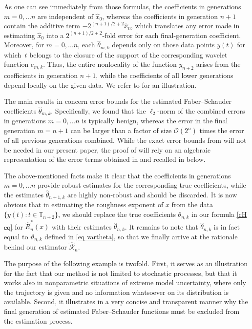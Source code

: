 \documentclass[12pt,reqno]{article}
\def\wh{\widehat}
\numberwithin{equation}{section}
\def\cR{{\mathscr R}}
\theoremstyle{definition}
\def\wh{\widehat}
\newcommand{\bT}{\mathbb{T}}
\begin{document}
As one can see immediately from those formulas,  the coefficients in generations $m=0,\dots n$ are independent of $\wh x_0$, whereas the coefficients in generation $n+1$ contain the additive term $-2^{(n+1)/2+2}\hat x_0$, which translates any error made in estimating $\hat x_0$ into a $2^{(n+1)/2+2}$-fold error for each final-generation coefficient. 
Moreover, for  $m=0,\dots n$, each $\wh\theta_{m,k}$ depends only on those data points $y(t)$ for which~$t$ belongs to the closure of the support of the corresponding wavelet function $e_{m,k}$. Thus, the entire nonlocality of the function $y_{n+2}$ arises from the coefficients in generation $n+1$, while the coefficients of all lower generations depend locally on the given data. We refer to \cite[Figure 2]{HanSchiedMatrix} for an illustration.

The main results in \cite{HanSchiedMatrix} concern error bounds for the estimated Faber--Schauder coefficients $\wh\theta_{m,k}$. Specifically, we found that the $\ell_2$-norm of the combined errors in generations $m=0,\dots n$ is typically benign, whereas the error in the 
  final generation $m=n+1$ can be larger than a factor of size $\mathcal{O}(2^n)$ times the error of all previous generations combined. While the exact error bounds from \cite{HanSchiedMatrix} will not be needed in our present paper, the proof of  will rely on an algebraic representation of the error terms obtained in \cite[Lemma 3.2]{HanSchiedMatrix} and recalled in  below. 




The above-mentioned facts make it clear that the coefficients in generations $m=0,\dots n$ provide robust estimates for the corresponding true coefficients, while the estimates $\wh\theta_{n+1,k}$ are highly non-robust and should be discarded. It is now obvious that in estimating the roughness exponent of $x$ from the data $\{y(t):t\in\bT_{n+2}\}$, we should replace the true coefficients $\theta_{n,k}$ in our formula \eqref{cH eq} for $\wh R^*_n(x)$ with their estimates $\wh\theta_{n,k}$. It remains to note that $\wh\theta_{n,k}$ is in fact equal to $\vartheta_{n,k}$ defined in \eqref{eq vartheta}, so that we finally arrive at the rationale behind our estimator $\wh\cR_n$. 

The purpose of the following example is twofold. First, it serves as an illustration for the fact that our method is not limited to stochastic processes,  but that it works also in nonparametric situations of extreme 
model uncertainty, where only the trajectory is given and no information whatsoever on its distribution is available.  
Second, it illustrates in a very concise and transparent manner why the final generation of estimated Faber--Schauder functions must be excluded from the estimation process. 
\end{document}

